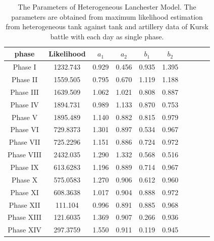 \documentclass[]{article}
\begin{document}
\begin{table}
\tiny
\caption{The Parameters of Heterogeneous Lanchester Model. The parameters are obtained from maximum likelihood estimation from heterogeneous tank against tank and artillery data of Kursk battle with each day as single phase.}
{\begin{tabular}{|c|c|c|c|c|c|c|c|c|c|}   \hline\hline
phase & Likelihood  &	\bf${a_1}$ &	\bf${a_2}$ &	\bf${b_1}$&	\bf${b_2}$	 \\
\hline
\hline
Phase I &1232.743& 0.929& 0.456& 0.935& 1.395\\
\hline
Phase II &1559.505 &0.795 &0.670 &1.119 &1.188 \\
\hline
Phase III& 1639.509& 1.062 &1.021& 0.808 &0.887\\
\hline
Phase IV &1894.731& 0.989 &1.133 &0.870 &0.753 \\
\hline
Phase V &1895.489 &1.140 &0.882& 0.815 &0.979 \\
\hline
Phase VI &729.8373 &1.301 &0.897 &0.534 &0.967 \\
\hline
Phase VII &725.2296 &1.151 &0.886 &0.724& 0.972 \\
\hline
Phase VIII& 2432.035 &1.290 &1.332 &0.568& 0.516\\
\hline
Phase IX &613.6283 &1.196& 0.889 &0.714 &0.967 \\
\hline
Phase X &575.0583 &1.270& 0.906 &0.612 &0.960 \\
\hline
Phase XI &608.3638 &1.017& 0.904& 0.888& 0.972\\
\hline
Phase XII &111.104 &0.996 &0.891 &0.885 &0.968\\
\hline
Phase XIII &121.6035 &1.369 &0.907& 0.266 &0.936\\
\hline
Phase XIV &297.3759 &1.550 &0.911 &0.119 &0.945 \\
\hline
\hline
\end{tabular}}
\end{table}
\end{document}
